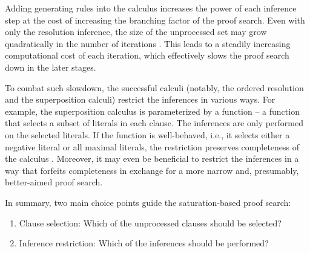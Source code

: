 Adding generating rules into the calculus increases the power of each inference step at the cost of increasing the branching factor of the proof search.
Even with only the resolution inference, the size of the unprocessed set may grow quadratically in the number of iterations \cite{}.
This leads to a steadily increasing computational cost of each iteration,
which effectively slows the proof search down in the later stages.


To combat such slowdown, the successful calculi (notably, the ordered resolution and the superposition calculi) restrict the inferences in various ways.
For example, the superposition calculus is parameterized by a  function -- a function that selects a subset of literals in each clause.
The inferences are only performed on the selected literals.
If the function is well-behaved,
i.e., it selects either a negative literal or all maximal literals,
the restriction preserves completeness of the calculus \cite{DBLP:journals/logcom/BachmairG94}.
Moreover, it may even be beneficial to restrict the inferences in a way that forfeits completeness
in exchange for a more narrow and, presumably, better-aimed proof search.

In summary, two main choice points guide the \gls{saturation}-based proof search:
\begin{enumerate}
\item Clause selection: Which of the unprocessed clauses should be selected?
\item Inference restriction: Which of the inferences should be performed?
\end{enumerate}

